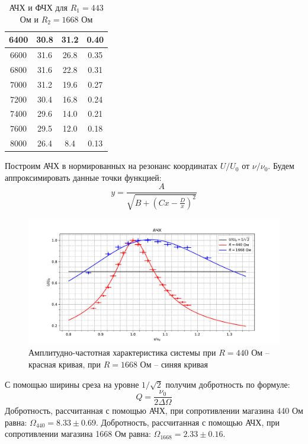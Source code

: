 \documentclass[a4paper,12pt]{extarticle}
\begin{document}
\begin{table}[h]
\begin{tabular}{|c|c|c|c|}
			6400 & 30.8 & 31.2 & 0.40 \\ \hline
			6600 & 31.6 & 26.8 & 0.35 \\ \hline
			6800 & 31.6 & 22.8 & 0.31 \\ \hline
			7000 & 31.2 & 19.6 & 0.27 \\ \hline
			7200 & 30.4 & 16.8 & 0.24 \\ \hline
			7400 & 29.6 & 14.0 & 0.21 \\ \hline
			7600 & 29.5 & 12.0 & 0.18 \\ \hline
			8000 & 26.4 & 8.4 & 0.13 \\ \hline
		\end{tabular}
		\caption{АЧХ и ФЧХ для $R_1 = 443$ Ом и $R_2 = 1668$ Ом}

	\end{table}


Построим АЧХ в нормированных на резонанс координатах $U/U_0$ от $\nu/\nu_0$. Будем аппроксимировать данные точки функцией:
$$y = \frac{A}{\sqrt{B + (Cx - \frac{D}{x})^2}}$$
\begin{figure}[h!]
    \centering
    \includegraphics[width=\textwidth]{ACCH.pdf}
    \caption{Амплитудно-частотная характеристика системы при $R = 440$ Ом -- красная кривая, при $R = 1668$ Ом -- синяя кривая}
\end{figure}

С помощью ширины среза на уровне $1/\sqrt{2}$ получим добротность по формуле:
\begin{equation}
    Q = \frac{\nu_0}{2 \Delta \Omega}
\end{equation}
Добротность, рассчитанная с помощью АЧХ, при сопротивлении магазина 440 Ом равна: $\Omega_\text{440} = 8.33\pm 0.69.$
Добротность, рассчитанная с помощью АЧХ, при сопротивлении магазина 1668 Ом равна: $\Omega_\text{1668} = 2.33 \pm 0.16.$
\end{document}
